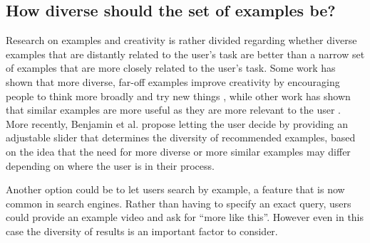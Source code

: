 \subsection{How diverse should the set of examples be?}
Research on examples and creativity is rather divided regarding whether diverse examples that are distantly related to the user's task are better than a narrow set of examples that are more closely related to the user's task. Some work has shown that more diverse, far-off examples improve creativity by encouraging people to think more broadly and try new things \cite{Chan2011, Siangliulue2015a}, while other work has shown that similar examples are more useful as they are more relevant to the user \cite{Chan2015}. More recently, Benjamin et al. \cite{Benjamin2014} propose letting the user decide by providing an adjustable slider that determines the diversity of recommended examples, based on the idea that the need for more diverse or more similar examples may differ depending on where the user is in their process.

Another option could be to let users search by example, a feature that is now common in search engines. Rather than having to specify an exact query, users could provide an example video and ask for ``more like this''. However even in this case the diversity of results is an important factor to consider.


